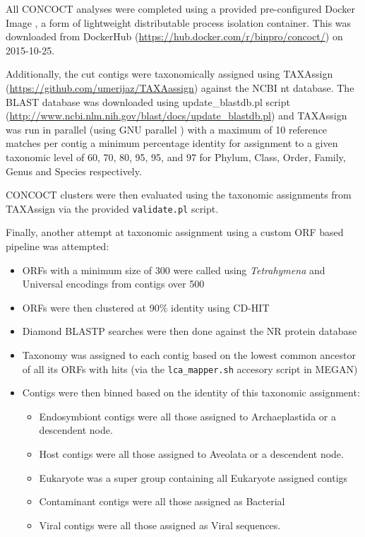 All CONCOCT analyses were completed using a provided pre-configured 
Docker Image \citep{Merkel2014}, a form of lightweight 
distributable process isolation container.
This was downloaded from DockerHub (\url{https://hub.docker.com/r/binpro/concoct/})
on 2015-10-25.

Additionally, the cut contigs were taxonomically assigned 
using TAXAssign (\url{https://github.com/umerijaz/TAXAassign}) against the NCBI nt database. 
The BLAST database was downloaded using update\_blastdb.pl script (\url{http://www.ncbi.nlm.nih.gov/blast/docs/update_blastdb.pl})
and TAXAssign was run in parallel (using GNU parallel \citep{Tange2011a})
with a maximum of 10 reference matches
per contig a minimum percentage identity for assignment
to a given taxonomic level of 60, 70, 80, 95, 95, and 97
for Phylum, Class, Order, Family, Genus and Species respectively. 

CONCOCT clusters were then evaluated using the taxonomic assignments from TAXAssign
via the provided \texttt{validate.pl} script.

Finally, another attempt at taxonomic assignment using a custom ORF based pipeline was attempted:
\begin{itemize}
    \item ORFs with a minimum size of 300 were called using \textit{Tetrahymena} and Universal encodings from contigs over \SI{500}{\bp} 
    \item ORFs were then clustered at 90\% identity using CD-HIT
    \item Diamond BLASTP searches were then done against the NR protein database
    \item Taxonomy was assigned to each contig based on the lowest common ancestor of all its
        ORFs with hits (via the \texttt{lca\_mapper.sh} accesory script in MEGAN)
    \item Contigs were then binned based on the identity of this taxonomic assignment:
        \begin{itemize}
            \item Endosymbiont contigs were all those assigned to Archaeplastida or a descendent node.
            \item Host contigs were all those assigned to Aveolata or a descendent node.
            \item Eukaryote was a super group containing all Eukaryote assigned contigs
            \item Contaminant contigs were all those assigned as Bacterial
            \item Viral contigs were all those assigned as Viral sequences. 
        \end{itemize}
\end{itemize}

